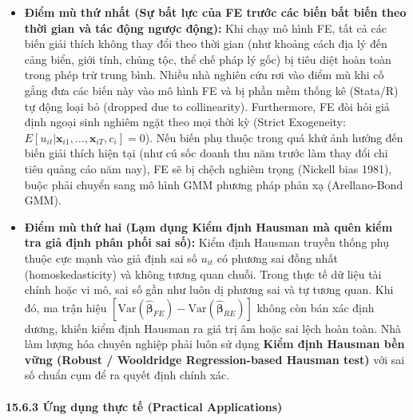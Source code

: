 \documentclass[
]{article}
\providecommand{\tightlist}{%
  \setlength{\itemsep}{0pt}\setlength{\parskip}{0pt}}
\begin{document}
\begin{itemize}
\tightlist
\item
  \textbf{Điểm mù thứ nhất (Sự bất lực của FE trước các biến bất biến
  theo thời gian và tác động ngược động):} Khi chạy mô hình FE, tất cả
  các biến giải thích không thay đổi theo thời gian (như khoảng cách địa
  lý đến cảng biển, giới tính, chủng tộc, thể chế pháp lý gốc) bị tiêu
  diệt hoàn toàn trong phép trừ trung bình. Nhiều nhà nghiên cứu rơi vào
  điểm mù khi cố gắng đưa các biến này vào mô hình FE và bị phần mềm
  thống kê (Stata/R) tự động loại bỏ (dropped due to collinearity).
  Furthermore, FE đòi hỏi giả định ngoại sinh nghiêm ngặt theo mọi thời
  kỳ (Strict Exogeneity:
  \(E[u_{it} | \mathbf{x}_{i1}, \dots, \mathbf{x}_{iT}, c_i] = 0\)). Nếu
  biến phụ thuộc trong quá khứ ảnh hưởng đến biến giải thích hiện tại
  (như cú sốc doanh thu năm trước làm thay đổi chi tiêu quảng cáo năm
  nay), FE sẽ bị chệch nghiêm trọng (Nickell bias 1981), buộc phải
  chuyển sang mô hình GMM phương pháp phản xạ (Arellano-Bond GMM).
\item
  \textbf{Điểm mù thứ hai (Lạm dụng Kiểm định Hausman mà quên kiểm tra
  giả định phân phối sai số):} Kiểm định Hausman truyền thống phụ thuộc
  cực mạnh vào giả định sai số \(u_{it}\) có phương sai đồng nhất
  (homoskedasticity) và không tương quan chuỗi. Trong thực tế dữ liệu
  tài chính hoặc vi mô, sai số gần như luôn dị phương sai và tự tương
  quan. Khi đó, ma trận hiệu
  \([\text{Var}(\hat{\boldsymbol{\beta}}_{FE}) - \text{Var}(\hat{\boldsymbol{\beta}}_{RE})]\)
  không còn bán xác định dương, khiến kiểm định Hausman ra giá trị âm
  hoặc sai lệch hoàn toàn. Nhà làm lượng hóa chuyên nghiệp phải luôn sử
  dụng \textbf{Kiểm định Hausman bền vững (Robust / Wooldridge
  Regression-based Hausman test)} với sai số chuẩn cụm để ra quyết định
  chính xác.
\end{itemize}

\paragraph{15.6.3 Ứng dụng thực tế (Practical
Applications)}\label{ux1ee9ng-dux1ee5ng-thux1ef1c-tux1ebf-practical-applications-58}
\end{document}
